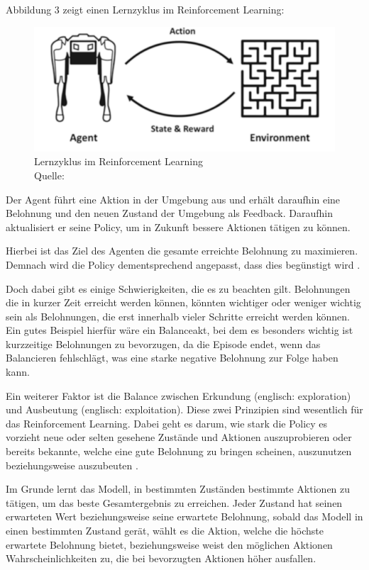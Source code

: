	Abbildung 3 zeigt einen Lernzyklus im Reinforcement Learning:
\nopagebreak
\begin{figure}[H]
\includegraphics[width=1\textwidth]{Bilder/rl} 
\caption[Lernzyklus im Reinforcement Learning]{Lernzyklus im Reinforcement Learning\\ Quelle: \cite{ris-ala_fundamentals_2023}}
\end{figure}

Der Agent führt eine Aktion in der Umgebung aus und erhält daraufhin eine Belohnung und den neuen Zustand der Umgebung als Feedback. Daraufhin aktualisiert er seine Policy, um in Zukunft bessere Aktionen tätigen zu können.

Hierbei ist das Ziel des Agenten die gesamte erreichte Belohnung zu maximieren. Demnach wird die Policy dementsprechend angepasst, dass dies begünstigt wird \cite[Seite 12f]{ris-ala_fundamentals_2023}.

Doch dabei gibt es einige Schwierigkeiten, die es zu beachten gilt. Belohnungen die in kurzer Zeit erreicht werden können, könnten wichtiger oder weniger wichtig sein als Belohnungen, die erst innerhalb vieler Schritte erreicht werden können. Ein gutes Beispiel hierfür wäre ein Balanceakt, bei dem es besonders wichtig ist kurzzeitige Belohnungen zu bevorzugen, da die Episode endet, wenn das Balancieren fehlschlägt, was eine starke negative Belohnung zur Folge haben kann.

Ein weiterer Faktor ist die Balance zwischen Erkundung (englisch: exploration) und Ausbeutung (englisch: exploitation). Diese zwei Prinzipien sind wesentlich für das Reinforcement Learning. Dabei geht es darum, wie stark die Policy es vorzieht neue oder selten gesehene Zustände und Aktionen auszuprobieren oder bereits bekannte, welche eine gute Belohnung zu bringen scheinen, auszunutzen beziehungsweise auszubeuten \cite[Seite 13]{ris-ala_fundamentals_2023}.

Im Grunde lernt das Modell, in bestimmten Zuständen bestimmte Aktionen zu tätigen, um das beste Gesamtergebnis zu erreichen. Jeder Zustand hat seinen erwarteten Wert beziehungsweise seine erwartete Belohnung, sobald das Modell in einen bestimmten Zustand gerät, wählt es die Aktion, welche die höchste erwartete Belohnung bietet, beziehungsweise weist den möglichen Aktionen Wahrscheinlichkeiten zu, die bei bevorzugten Aktionen höher ausfallen.\\

